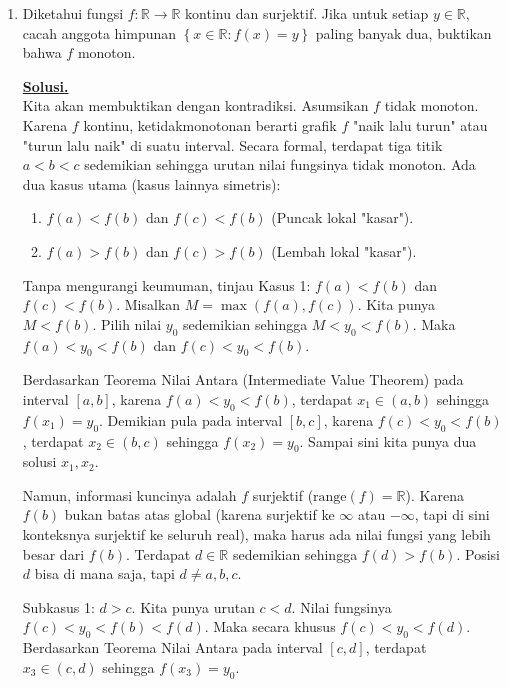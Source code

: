 \documentclass[12pt,twoside]{article}
\newenvironment{solution}
{
	\par\noindent\textbf{\underline{Solusi.}}\\
}
{
	\par
}
\begin{document}
\begin{enumerate}
  \item Diketahui fungsi $f : \mathbb{R}\to\mathbb{R}$ kontinu dan surjektif. Jika untuk setiap $y \in \mathbb{R}$, cacah anggota himpunan $\left\lbrace x\in\mathbb{R} : f(x) = y \right\rbrace$ paling banyak dua, buktikan bahwa $f$ monoton.
        \begin{solution}
          Kita akan membuktikan dengan kontradiksi.
          Asumsikan $f$ tidak monoton.
          Karena $f$ kontinu, ketidakmonotonan berarti grafik $f$ "naik lalu turun" atau "turun lalu naik" di suatu interval.
          Secara formal, terdapat tiga titik $a < b < c$ sedemikian sehingga urutan nilai fungsinya tidak monoton.
          Ada dua kasus utama (kasus lainnya simetris):
          \begin{enumerate}
            \item $f(a) < f(b)$ dan $f(c) < f(b)$ (Puncak lokal "kasar").
            \item $f(a) > f(b)$ dan $f(c) > f(b)$ (Lembah lokal "kasar").
          \end{enumerate}

          Tanpa mengurangi keumuman, tinjau Kasus 1: $f(a) < f(b)$ dan $f(c) < f(b)$.
          Misalkan $M = \max(f(a), f(c))$. Kita punya $M < f(b)$.
          Pilih nilai $y_0$ sedemikian sehingga $M < y_0 < f(b)$.
          Maka $f(a) < y_0 < f(b)$ dan $f(c) < y_0 < f(b)$.

          Berdasarkan Teorema Nilai Antara (Intermediate Value Theorem) pada interval $[a, b]$, karena $f(a) < y_0 < f(b)$, terdapat $x_1 \in (a, b)$ sehingga $f(x_1) = y_0$.
          Demikian pula pada interval $[b, c]$, karena $f(c) < y_0 < f(b)$, terdapat $x_2 \in (b, c)$ sehingga $f(x_2) = y_0$.
          Sampai sini kita punya dua solusi $x_1, x_2$.

          Namun, informasi kuncinya adalah $f$ surjektif ($\text{range}(f) = \mathbb{R}$).
          Karena $f(b)$ bukan batas atas global (karena surjektif ke $\infty$ atau $-\infty$, tapi di sini konteksnya surjektif ke seluruh real), maka harus ada nilai fungsi yang lebih besar dari $f(b)$.
          Terdapat $d \in \mathbb{R}$ sedemikian sehingga $f(d) > f(b)$.
          Posisi $d$ bisa di mana saja, tapi $d \neq a, b, c$.

          Subkasus 1: $d > c$.
          Kita punya urutan $c < d$. Nilai fungsinya $f(c) < y_0 < f(b) < f(d)$.
          Maka secara khusus $f(c) < y_0 < f(d)$.
          Berdasarkan Teorema Nilai Antara pada interval $[c, d]$, terdapat $x_3 \in (c, d)$ sehingga $f(x_3) = y_0$.


\end{solution}
\end{enumerate}
\end{document}
